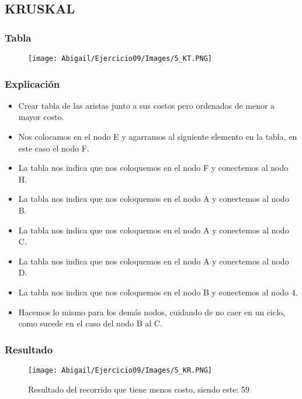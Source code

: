 \documentclass[12pt]{article}
\begin{document}
    \newpage

    \subsection{KRUSKAL}

      \subsubsection{Tabla}
        \begin{figure}[h!]
          \centering
          \texttt{[image: Abigail/Ejercicio09/Images/5\_KT.PNG]}
        \end{figure} 
        
        \subsubsection{Explicación}
            \begin{itemize}
    
             \item[\checkmark] Crear tabla de las aristas junto a sus costos pero ordenados de menor a mayor costo.

              \item[\checkmark] Nos colocamos en el nodo E y agarramos al siguiente elemento en la tabla, en este caso el nodo F.
              
              \item[\checkmark] La tabla nos indica que nos coloquemos en el nodo F y conectemos al nodo H.
              
              \item[\checkmark] La tabla nos indica que nos coloquemos en el nodo A y conectemos al nodo B.
              
              \item[\checkmark] La tabla nos indica que nos coloquemos en el nodo A y conectemos al nodo C.
              
              \item[\checkmark] La tabla nos indica que nos coloquemos en el nodo A y conectemos al nodo D.
              
              \item[\checkmark] La tabla nos indica que nos coloquemos en el nodo B y conectemos al nodo $4$.
              
              \item[\checkmark] Hacemos lo mismo para los demás nodos, cuidando de no caer en un ciclo, como sucede en el caso del nodo B al C.
    
            \end{itemize}
\newpage
      \subsubsection{Resultado}

        \begin{figure}[h!]
          \centering
          \texttt{[image: Abigail/Ejercicio09/Images/5\_KR.PNG]}
          \caption{Resultado del recorrido que tiene menos costo, siendo este: 59}
        \end{figure} 
\end{document}
